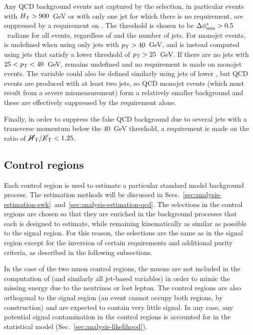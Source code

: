 Any QCD background events not captured by the \alphat selection, in particular 
events with $\mbox{$H_\text{T}$}>900$~GeV or with only one jet for which there is no 
\alphat requirement, are suppressed by a requirement on \bdphi. The threshold 
is chosen to be $\mbox{$\Delta\phi^{*}_{\mathrm{min}}$}>0.5$~radians for all events, regardless of \scalht and 
the 
number of jets. For monojet events, \bdphi is undefined when using only jets 
with ${p_{\text T}}>40$~GeV, and is instead computed using jets that satisfy a lower 
threshold of ${p_{\text T}}>25$~GeV. If there are no jets with $25<{p_{\text T}}<40$~GeV, \bdphi 
remains undefined and no requirement is made on monojet events. The \alphat 
variable could also be defined similarly using jets of lower \pt, but QCD 
events are produced with at least two jets, so QCD monojet events (which must 
result from a severe mismeasurement) form a relatively smaller background and 
these are effectively suppressed by the \bdphi requirement alone.

Finally, in order to suppress the fake \met QCD background due to several jets 
with a transverse momentum below the 40~GeV threshold, a requirement is made on 
the \mhtmet ratio of $\mbox{$\mbox{$\cancel{H}_\text{T}$} / \mbox{$\cancel{E}_\text{T}$}$} < 1.25$.

\subsection{Control regions}
\label{sec:analysis-eventselection-cr}
Each control region is used to estimate a particular standard model background 
process. The estimation methods will be discussed in 
Secs.~\ref{sec:analysis-estimation-ewk}~and~\ref{sec:analysis-estimation-qcd}.
The selections in the control regions are chosen so that they are enriched in 
the background processes that each is designed to estimate, while remaining 
kinematically as similar as possible to the signal region. 
For this reason, the 
selections are the same as in the signal region except for the inversion of 
certain requirements and additional purity criteria, as described in the 
following subsections.

In the case of the two muon control regions, the muons are not included in the 
computation of \met (and similarly all jet-based variables) in order to mimic 
the missing energy due to the neutrinos or lost lepton.
The control regions are also orthogonal to the signal 
region (an event cannot occupy both regions, by construction) and are expected 
to contain very little signal. In any case, any potential signal contamination 
in the control regions is accounted for in the statistical model 
(Sec.~\ref{sec:analysis-likelihood}).

